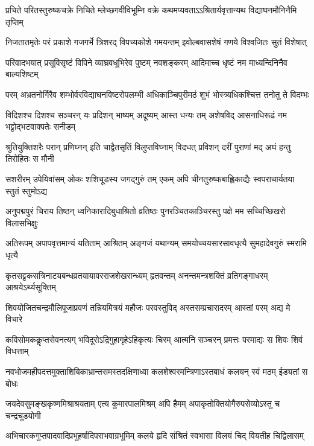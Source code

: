 \twolineshloka
{प्रचिते परितस्तुरुष्कचक्रे निचिते म्लेच्छगवीविभूम्नि वक्रे}
{कथमप्यवताऽऽश्रितार्यवृत्तान्यथ विद्याघनमौनिनैमि तृप्तिम्}%

\twolineshloka
{निजतातमृतेः परं प्रकाशे गजगर्भे त्रिशरद् विपच्यकोशे}
{गमयन्तम् इवोल्बवासशेषं गणये विश्वजितः सुतं विशेषात्}%

\twolineshloka
{परिवादभयात् प्रसूविसृष्टं विपिने व्याघ्रवधूभिरेव पुष्टम्}
{नवशङ्करम् आदिमाच्च धृष्टं नम माध्यन्दिनिनैव बाल्यशिष्टम्}%

\twolineshloka
{परम् अभ्रतनोर्गिरैव शम्भोर्वरविद्याघनविष्टरोपलम्भी}
{अधिकाञ्चिपुरीमठं शुभं भोस्त्र्यधिकश्चित्त तनोतु ते विदम्भः}%

\twolineshloka
{विदिशश्च दिशश्च सञ्चरन् यः प्रदिशन् भाष्यम् अदूष्यम् आस्त धन्यः}
{तम् अशेषविद् आसनाधिरूढं नम भट्टोद्भटवाक्पतेः सनीडम्}%

\twolineshloka
{श्रुतियुक्तिशरैः परान् प्रणिघ्नन् इति चाद्वैतसृतिं विलुप्तविघ्नाम्}
{विदधत् प्रविशन् दरीं पुराणां मद् अघं हन्तु तिरोहितः स मौनी}%

\twolineshloka
{सशरीरम् उपेयिवांसम् ओकः शशिचूडस्य जगद्गुरुं तम् एकम्}
{अपि चीनतुरुष्कबाह्लिकाद्यैः स्वपराचार्यतया स्तुतं स्तुमोऽद्य}%

\twolineshloka
{अनुपद्मपुरं चिराय तिष्ठन् ध्वनिकारादिबुधाश्रितो व्रतिष्ठः}
{पुनरञ्चितकाञ्चिरस्तु पक्षे मम सच्चिच्छिखरो विलासभिक्षुः}%

\twolineshloka
{अतिरूपम् अपापवृत्तमान्यं यतिताम् आश्रितम् अङ्गजं यथान्यम्}
{समयोच्चयसारसावधृत्यै सुमहादेवगुरुं स्मरामि धृत्यै}%

\twolineshloka
{कृतसट्टकसत्रिनाट्यबन्धव्रतयायावरराजशेखरान्ध्यम्}
{हृतवन्तम् अनन्तमन्त्रशक्तिं व्रतिगङ्गाधरम् आश्रयेऽर्थ्यसूक्तिम्}%

\twolineshloka
{शिवयोजितचन्द्रमौलिपूजाप्रवणं तन्नियमित्रयं महौजः}
{परवस्तुविद् अस्तसम्प्रचारादरम् आस्तां परम् अद्य मे विचारे}%

\twolineshloka
{कविसोमककॢप्तसेवनत्यग् भविदूरोऽद्रिगुहागृहेऽहिकृत्यः}
{चिरम् आत्मनि सञ्चरन् प्रमत्तः परमाद्यः स शिवः शिवं विधत्ताम्}%

\twolineshloka
{नवभोजमहीपदत्तमुक्ताशिबिकाभ्रान्तसमस्तदक्षिणाध्वा}
{कलशेश्वरमन्त्रिणाऽस्तबाधं कलयन् स्वं मठम् ईड्यतां स बोधः}%

\twolineshloka
{जयदेवसुमङ्खकृष्णमिश्राश्रयताम् एत्य कुमारपालमिश्रम्}
{अपि हैमम् अपाकृतोक्तियोगैरुपसेव्योऽस्तु च चन्द्रचूडयोगी}%

\twolineshloka
{अभिचारकगुप्तपादवादिप्रभुहर्षादिपराभवाग्रभूमिम्}
{कलये हृदि संश्रितं स्वभासा विलयं चिद् वियतीह चिद्विलासम्}%

